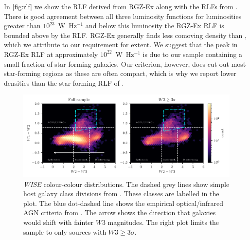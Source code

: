 \documentclass[11pt, a4paper]{book}
\begin{document}
  In \autoref{fig:rlf} we show the RLF derived from RGZ-Ex along with the RLFs from \citet{mauch07rlf}. There is good
  agreement between all three luminosity functions for luminosities greater than $10^{23}$~W~Hz$^{-1}$
  and below this luminosity the RGZ-Ex RLF is bounded above by the
  \citet{mauch07rlf} RLF. RGZ-Ex generally finds less comoving density than \citet{mauch07rlf}, which we attribute to our requirement for extent. We suggest that the peak in RGZ-Ex RLF at approximately $10^{22}$~W~Hz$^{-1}$ is due to our sample containing a small fraction of star-forming galaxies. Our criterion, however, does cut out most star-forming regions as these are often compact, which is why we report lower densities than the star-forming RLF of \citet{mauch07rlf}.

\begin{figure}
    \centering
    \includegraphics[width=\linewidth]{rlf-images/colour-colour.pdf}
    \caption[\emph{WISE} colour-colour distributions.]{\emph{WISE} colour-colour distributions. The dashed grey lines show
      simple host galaxy class divisions from \citet{jarrett17wise}. These
      classes are labelled in the plot. The blue dot-dashed line shows
      the empirical optical/infrared AGN criteria from \citet{jarrett11wise}. The arrow shows the direction that galaxies would shift with fainter $W3$ magnitudes. The right plot limits the sample to only sources with $W3 \geq 3 \sigma$.
      \label{fig:colour-colour}}
  \end{figure}
\end{document}
